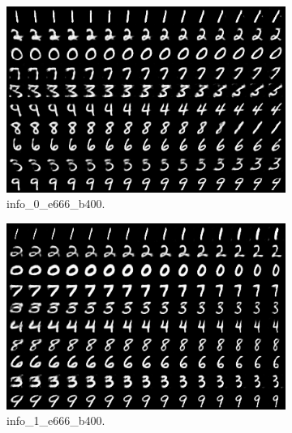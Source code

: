 \begin{figure}[!htbp]
   \centering
\begin{subfigure}[t]{0.48\textwidth}
   \includegraphics[width=\textwidth,center]{2019-04-30/mnist/info/info_0_e666_b400.png}
   \caption{info_0_e666_b400.}
   \label{fig:.._.._notes_journal_figures_2019-04-30_mnist_info-a}
\end{subfigure}
\begin{subfigure}[t]{0.48\textwidth}
   \includegraphics[width=\textwidth,center]{2019-04-30/mnist/info/info_1_e666_b400.png}
   \caption{info_1_e666_b400.}
   \label{fig:.._.._notes_journal_figures_2019-04-30_mnist_info-b}
\end{subfigure}
\begin{subfigure}[t]{0.48\textwidth}

\end{subfigure}
\end{figure}
